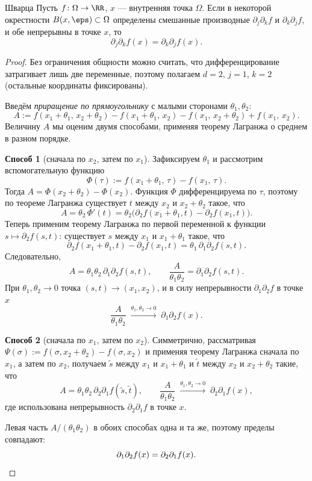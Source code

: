 \begin{Theorem}{Шварца}{}
	Пусть $f\colon\Omega\to\RR$, $x$ --- внутренняя точка $\Omega$. Если в некоторой
	окрестности $B(x,\eps)\subset\Omega$ определены смешанные производные
	$\partial_j\partial_k f$ и $\partial_k\partial_j f$, и обе непрерывны в точке $x$,
	то
	\[
	\partial_j\partial_k f(x)=\partial_k\partial_j f(x).
	\]
\end{Theorem}

\begin{proof}
	Без ограничения общности можно считать, что дифференцирование затрагивает лишь
	две переменные, поэтому полагаем $d=2$, $j=1$, $k=2$ (остальные координаты
	фиксированы).

	Введём \emph{приращение по прямоугольнику} с малыми сторонами $\theta_1,\theta_2$:
	\[
	A:=f(x_1+\theta_1,\,x_2+\theta_2)
	- f(x_1+\theta_1,\,x_2)
	- f(x_1,\,x_2+\theta_2)
	+ f(x_1,\,x_2).
	\]
	Величину $A$ мы оценим двумя способами, применяя теорему Лагранжа о среднем в
	разном порядке.

	\textbf{Способ 1} (сначала по $x_2$, затем по $x_1$).
	Зафиксируем $\theta_1$ и рассмотрим вспомогательную функцию
	\[
	\Phi(\tau):=f(x_1+\theta_1,\,\tau)-f(x_1,\,\tau).
	\]
	Тогда $A=\Phi(x_2+\theta_2)-\Phi(x_2)$. Функция $\Phi$ дифференцируема по $\tau$,
	поэтому по теореме Лагранжа существует $t$ между $x_2$ и $x_2+\theta_2$ такое, что
	\[
	A=\theta_2\,\Phi'(t)
	=\theta_2\bigl(\partial_2 f(x_1+\theta_1,t)-\partial_2 f(x_1,t)\bigr).
	\]
	Теперь применим теорему Лагранжа по первой переменной к функции
	$s\mapsto\partial_2 f(s,t)$: существует $s$ между $x_1$ и $x_1+\theta_1$ такое, что
	\[
	\partial_2 f(x_1+\theta_1,t)-\partial_2 f(x_1,t)=\theta_1\,\partial_1\partial_2 f(s,t).
	\]
	Следовательно,
	\[
	A=\theta_1\theta_2\,\partial_1\partial_2 f(s,t),
	\qquad
	\frac{A}{\theta_1\theta_2}=\partial_1\partial_2 f(s,t).
	\]
	При $\theta_1,\theta_2\to 0$ точка $(s,t)\to(x_1,x_2)$, и в силу непрерывности
	$\partial_1\partial_2 f$ в точке $x$
	\[
	\frac{A}{\theta_1\theta_2}\;\xrightarrow{\theta_1,\theta_2\to 0}\;\partial_1\partial_2 f(x).
	\]

	\textbf{Способ 2} (сначала по $x_1$, затем по $x_2$).
	Симметрично, рассматривая
	$\Psi(\sigma):=f(\sigma,x_2+\theta_2)-f(\sigma,x_2)$ и применяя теорему Лагранжа
	сначала по $x_1$, а затем по $x_2$, получаем
	$\tilde s$ между $x_1$ и $x_1+\theta_1$ и $\tilde t$ между $x_2$ и $x_2+\theta_2$
	такие, что
	\[
	A=\theta_1\theta_2\,\partial_2\partial_1 f(\tilde s,\tilde t),
	\qquad
	\frac{A}{\theta_1\theta_2}\;\xrightarrow{\theta_1,\theta_2\to 0}\;\partial_2\partial_1 f(x),
	\]
	где использована непрерывность $\partial_2\partial_1 f$ в точке $x$.

	Левая часть $A/(\theta_1\theta_2)$ в обоих способах одна и та же, поэтому пределы
	совпадают:
	\[
	\partial_1\partial_2 f(x)=\partial_2\partial_1 f(x). \qedhere
	\]
\end{proof}

